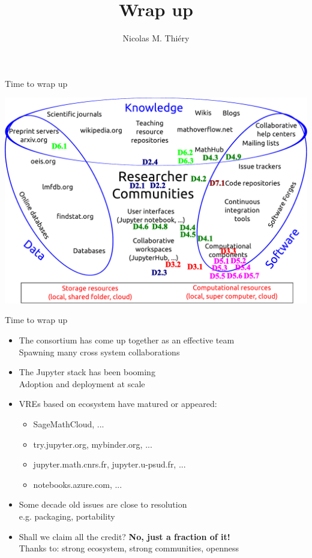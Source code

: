 \documentclass{beamer}
\author{Nicolas M. Thiéry}
\title{Wrap up}
\begin{document}
\begin{frame}{Time to wrap up}
  \centerline{\includegraphics[height=.85\textheight]{TheBigPictureDeliverables.pdf}}
\end{frame}

\begin{frame}{Time to wrap up}
  \begin{itemize}
  \item The consortium has come up together as an effective team\\
    Spawning many cross system collaborations
    \pause\bigskip
  \item The Jupyter stack has been booming\\
    Adoption and deployment at scale
    \pause\bigskip
  \item VREs based on ecosystem have matured or appeared:
    \begin{itemize}
    \item SageMathCloud, ...
    \item try.jupyter.org, mybinder.org, ...
    \item jupyter.math.cnrs.fr, jupyter.u-psud.fr, ...
    \item notebooks.azure.com, ...
    \end{itemize}
    \pause\bigskip
  \item Some decade old issues are close to resolution\\
    e.g. packaging, portability
    \pause\bigskip
  \item Shall we claim all the credit? \pause \textbf{No, just a fraction of it!}\\\pause
    Thanks to: strong ecosystem, strong communities, openness
  \end{itemize}
\end{frame}
\end{document}
